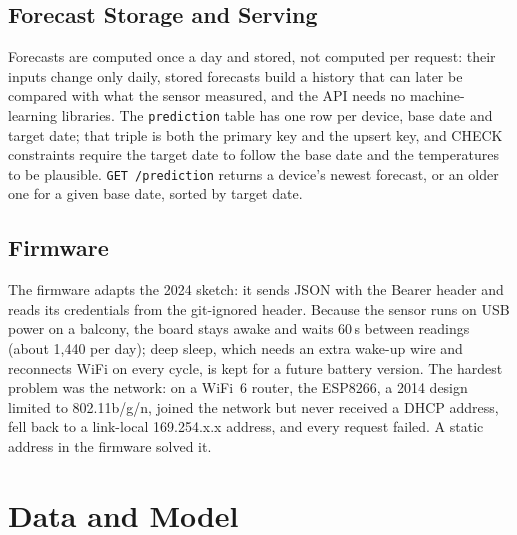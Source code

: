 \documentclass[conference]{IEEEtran}
\begin{document}
\subsection{Forecast Storage and Serving}
Forecasts are computed once a day and stored, not computed per request: their inputs change only daily, stored forecasts build a history that can later be compared with what the sensor measured, and the API needs no machine-learning libraries. The \texttt{prediction} table has one row per device, base date and target date; that triple is both the primary key and the upsert key, and CHECK constraints require the target date to follow the base date and the temperatures to be plausible. \texttt{GET /prediction} returns a device's newest forecast, or an older one for a given base date, sorted by target date.

\subsection{Firmware}
The firmware adapts the 2024 sketch: it sends JSON with the Bearer header and reads its credentials from the git-ignored header. Because the sensor runs on USB power on a balcony, the board stays awake and waits 60\,s between readings (about 1,440 per day); deep sleep, which needs an extra wake-up wire and reconnects WiFi on every cycle, is kept for a future battery version. The hardest problem was the network: on a WiFi~6 router, the ESP8266, a 2014 design limited to 802.11b/g/n, joined the network but never received a DHCP address, fell back to a link-local 169.254.x.x address, and every request failed. A static address in the firmware solved it.

\section{Data and Model}
\label{sec:data}
\end{document}
